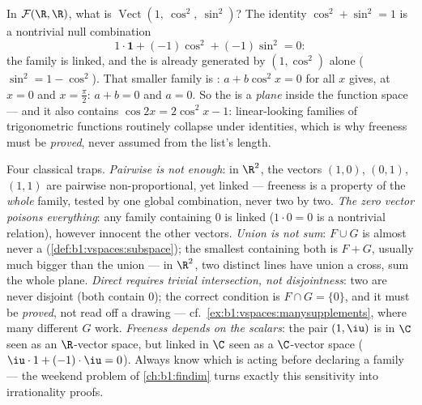 \begin{example}
\label{ex:b1:vspaces:hiddenrelation}
In $\mathcal{F}(\R, \R)$, what is
$\operatorname{Vect}(1,\ \cos^2,\ \sin^2)$? The identity
$\cos^2 + \sin^2 = 1$ is a nontrivial null combination
\[
1\cdot\mathbf{1} + (-1)\cos^2 + (-1)\sin^2 = 0 :
\]
the family is linked, and the  is already generated by
$(1, \cos^2)$ alone ($\sin^2 = 1 - \cos^2$). That smaller family
is : $a + b\cos^2 x = 0$ for all $x$ gives, at $x = 0$ and
$x = \frac\pi2$: $a + b = 0$ and $a = 0$. So the  is a
\emph{plane} inside the function space --- and it also contains
$\cos 2x = 2\cos^2 x - 1$: linear-looking families of
trigonometric functions routinely collapse under identities,
which is why freeness must be \emph{proved}, never assumed from
the list's length.
\end{example}

\begin{remark}
\label{rem:b1:vspaces:pitfalls}
Four classical traps.
\emph{Pairwise is not enough}: in $\R^2$, the vectors $(1,0)$,
$(0,1)$, $(1,1)$ are pairwise non-proportional, yet linked ---
freeness is a property of the \emph{whole} family, tested by one
global combination, never two by two.
\emph{The zero vector poisons everything}: any family containing
$0$ is linked ($1\cdot 0 = 0$ is a nontrivial relation), however
innocent the other vectors.
\emph{Union is not sum}: $F \cup G$ is almost never a 
(\cref{def:b1:vspaces:subspace}); the smallest 
containing both is $F + G$, usually much bigger than the union
--- in $\R^2$, two distinct lines have union a cross, sum the
whole plane.
\emph{Direct requires trivial intersection, not disjointness}:
two  are never disjoint (both contain $0$); the correct
condition is $F \cap G = \{0\}$, and it must be \emph{proved},
not read off a drawing --- cf.\
\cref{ex:b1:vspaces:manysupplements}, where many different $G$
work.
\emph{Freeness depends on the scalars}: the pair $(1, \iu)$ is
 in $\C$ seen as an $\R$-vector space, but linked in $\C$
seen as a $\C$-vector space ($\iu\cdot 1 + (-1)\cdot\iu = 0$).
Always know which  is acting before declaring a family 
--- the weekend problem of \cref{ch:b1:findim} turns exactly
this sensitivity into irrationality proofs.
\end{remark}

